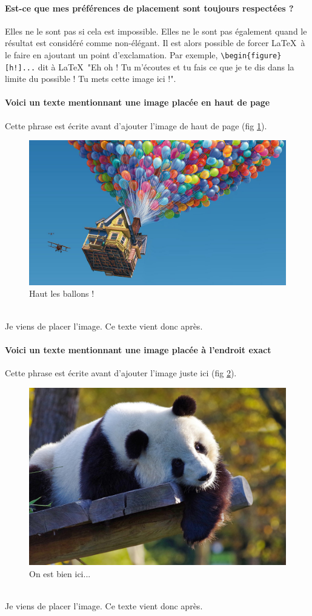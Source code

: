 \documentclass[a4paper, 13pt]{report} %
\begin{document}
		\paragraph{Est-ce que mes préférences de placement sont toujours respectées ?\\}
			Elles ne le sont pas si cela est impossible. Elles ne le sont pas également quand le résultat est considéré comme non-élégant. Il est alors possible de forcer \LaTeX\ à le faire en ajoutant un point d'exclamation. Par exemple, \verb|\begin{figure}[h!]...| dit à \LaTeX\ "Eh oh ! Tu m'écoutes et tu fais ce que je te dis dans la limite du possible ! Tu mets cette image ici !".
		
		\newpage
		\paragraph{Voici un texte mentionnant une image placée en haut de page\\}
			Cette phrase est écrite avant d'ajouter l'image de haut de page (fig \ref{fig:haut1}).
			\begin{figure}[t]\centering
				\includegraphics[width=.5\textwidth]{positions/haut.jpg}
				\caption{\label{fig:haut1}Haut les ballons !}
			\end{figure}
			\\Je viens de placer l'image. Ce texte vient donc après.
		\paragraph{Voici un texte mentionnant une image placée à l'endroit exact\\}
			Cette phrase est écrite avant d'ajouter l'image juste ici  (fig \ref{fig:ici1}).
			\begin{figure}[h]\centering
				\includegraphics[width=.4\textwidth]{positions/where_i_want.jpg}
				\caption{\label{fig:ici1}On est bien ici...}
			\end{figure}
			\\Je viens de placer l'image. Ce texte vient donc après.
\end{document}
